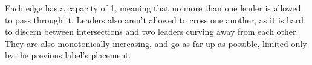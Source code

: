 \documentclass[11pt,a4paper]{vutinfth}
\begin{document}
Each edge has a capacity of 1, meaning that no more than one leader is allowed to pass through it. Leaders also aren't allowed to cross one another, as it is hard to discern between intersections and two leaders curving away from each other. They are also monotonically increasing, and go as far up as possible, limited only by the previous label's placement. %



\end{document}
